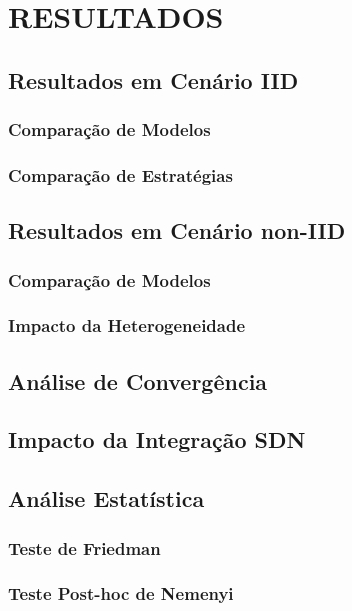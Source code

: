 \section{RESULTADOS}

\subsection{Resultados em Cenário IID}

\subsubsection{Comparação de Modelos}

\subsubsection{Comparação de Estratégias}

\subsection{Resultados em Cenário non-IID}

\subsubsection{Comparação de Modelos}

\subsubsection{Impacto da Heterogeneidade}

\subsection{Análise de Convergência}

\subsection{Impacto da Integração SDN}

\subsection{Análise Estatística}

\subsubsection{Teste de Friedman}

\subsubsection{Teste Post-hoc de Nemenyi}
